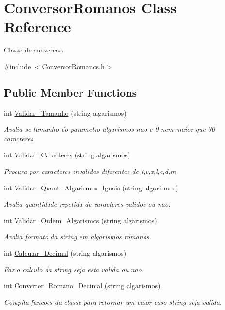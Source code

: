 \hypertarget{classConversorRomanos}{}\section{Conversor\+Romanos Class Reference}
\label{classConversorRomanos}


Classe de convercao.  




{\ttfamily \#include $<$Conversor\+Romanos.\+h$>$}

\subsection*{Public Member Functions}
\begin{DoxyCompactItemize}
\item 
int \hyperlink{classConversorRomanos_aee7464a39a874332cd70237872f5909c}{Validar\+\_\+\+Tamanho} (string algarismos)
\begin{DoxyCompactList}\small\item\em Avalia se tamanho do parametro algarismos nao e 0 nem maior que 30 caracteres. \end{DoxyCompactList}\item 
int \hyperlink{classConversorRomanos_adc421e09c99a9967e4caec26a4bb6b3d}{Validar\+\_\+\+Caracteres} (string algarismos)
\begin{DoxyCompactList}\small\item\em Procura por caracteres invalidos diferentes de i,v,x,l,c,d,m. \end{DoxyCompactList}\item 
int \hyperlink{classConversorRomanos_a349a0f01964b264de8b8f3bf00c97d96}{Validar\+\_\+\+Quant\+\_\+\+Algarismos\+\_\+\+Iguais} (string algarismos)
\begin{DoxyCompactList}\small\item\em Avalia quantidade repetida de caracteres validos ou nao. \end{DoxyCompactList}\item 
int \hyperlink{classConversorRomanos_a85e46dc74573ba883fd7129f22924022}{Validar\+\_\+\+Ordem\+\_\+\+Algarismos} (string algarismos)
\begin{DoxyCompactList}\small\item\em Avalia formato da string em algarismos romanos. \end{DoxyCompactList}\item 
int \hyperlink{classConversorRomanos_aabb8ee0acfc4a14909bdbd6324a099dc}{Calcular\+\_\+\+Decimal} (string algarismos)
\begin{DoxyCompactList}\small\item\em Faz o calculo da string seja esta valida ou nao. \end{DoxyCompactList}\item 
int \hyperlink{classConversorRomanos_a980f15e1de74af5d12827c91ff850abe}{Converter\+\_\+\+Romano\+\_\+\+Decimal} (string algarismos)
\begin{DoxyCompactList}\small\item\em Compila funcoes da classe para retornar um valor caso string seja valida. \end{DoxyCompactList}\end{DoxyCompactItemize}
